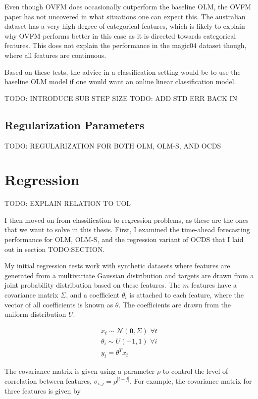 Even though OVFM does occasionally outperform the baseline OLM, the OVFM paper
has not uncovered in what situations one can expect this. The australian
dataset has a very high degree of categorical features, which is likely to
explain why OVFM performs better in this case as it is directed towards
categorical features. This does not explain the performance in the magic04
dataset though, where all features are continuous.

Based on these tests, the advice in a classification setting would be to use
the baseline OLM model if one would want an online linear classification model.

TODO: INTRODUCE SUB STEP SIZE
TODO: ADD STD ERR BACK IN

\subsection{Regularization Parameters}
TODO: REGULARIZATION FOR BOTH OLM, OLM-S, AND OCDS


\section{Regression}
TODO: EXPLAIN RELATION TO UOL

I then moved on from classification to regression problems, as these are the
ones that we want to solve in this thesis. First, I examined the time-ahead
forecasting performance for OLM, OLM-S, and the regression variant
of OCDS that I laid out in section TODO:SECTION.

My initial regression tests work with synthetic datasets where features are
generated from a multivariate Gaussian distribution and targets are drawn from
a joint probability distribution based on these features. The $m$ features have
a covariance matrix $\Sigma$, and a coefficient $\theta_i$ is attached to each
feature, where the vector of all coefficients is known as $\theta$. The
coefficients are drawn from the uniform distribution $U$.

\begin{align}
  x_t \sim \mathcal N (\mathbf{0}, \Sigma) \,\, \forall t \\
  \theta_i \sim U(-1,1) \,\, \forall i                    \\
  y_t = \theta^T x_t
\end{align}

The covariance matrix is given using a parameter $\rho$ to control the level of
correlation between features, $\sigma_{i,j} = \rho^{|i-j|}$. For example, the
covariance matrix for three features is given by

